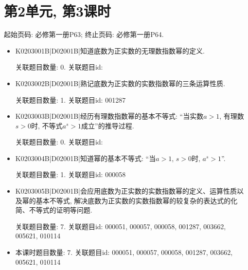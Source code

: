 \section*{第2单元, 第3课时}
起始页码: 必修第一册P63; 终止页码: 必修第一册P64.
\begin{itemize}
\item K0203001B|D02001B|知道底数为正实数的无理数指数幂的定义.

关联题目数量: 0. 关联题目id: 

\item K0203002B|D02001B|熟记底数为正实数的实数指数幂的三条运算性质.

关联题目数量: 1. 关联题目id: 001287

\item K0203003B|D02001B|经历有理数指数幂的基本不等式: ``当实数$a>1$, 有理数$s>0$时, 不等式$a^s>1$成立''的推导过程.

关联题目数量: 0. 关联题目id: 

\item K0203004B|D02001B|知道幂的基本不等式: ``当$a>1$, $s>0$时, $a^s>1$''.

关联题目数量: 1. 关联题目id: 000058

\item K0203005B|D02001B|会应用底数为正实数的实数指数幂的定义、运算性质以及幂的基本不等式, 解决底数为正实数的实数指数幂的较复杂的表达式的化简、不等式的证明等问题.

关联题目数量: 7. 关联题目id: 000051, 000057, 000058, 001287, 003662, 005621, 010114

\item 本课时题目数量: 7. 关联题目id: 000051, 000057, 000058, 001287, 003662, 005621, 010114

\end{itemize}


